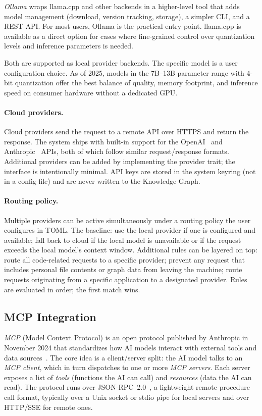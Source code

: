 \emph{Ollama} wraps llama.cpp and other backends in a higher-level tool that
adds model management (download, version tracking, storage), a simpler CLI,
and a REST API. For most users, Ollama is the practical entry point. llama.cpp
is available as a direct option for cases where fine-grained control over
quantization levels and inference parameters is needed.

Both are supported as local provider backends. The specific model is a user
configuration choice. As of 2025, models in the 7B--13B parameter range with
4-bit quantization offer the best balance of quality, memory footprint, and
inference speed on consumer hardware without a dedicated GPU.

\paragraph{Cloud providers.}
Cloud providers send the request to a remote API over HTTPS and return the
response. The system ships with built-in support for the
OpenAI~\cite{openai:api} and Anthropic~\cite{anthropic:api} APIs, both of
which follow similar request/response formats. Additional providers can be
added by implementing the provider trait; the interface is intentionally
minimal. API keys are stored in the system keyring (not in a config file) and
are never written to the Knowledge Graph.

\paragraph{Routing policy.}
Multiple providers can be active simultaneously under a routing policy the
user configures in TOML. The baseline: use the local provider if one is
configured and available; fall back to cloud if the local model is unavailable
or if the request exceeds the local model's context window. Additional rules
can be layered on top: route all code-related requests to a specific provider;
prevent any request that includes personal file contents or graph data from
leaving the machine; route requests originating from a specific application to
a designated provider. Rules are evaluated in order; the first match wins.

\subsection{MCP Integration}
\label{sec:mcp}

\emph{MCP} (Model Context Protocol) is an open protocol published by Anthropic
in November 2024 that standardizes how AI models interact with external tools
and data sources~\cite{mcp:spec}. The core idea is a client/server split: the
AI model talks to an \emph{MCP client}, which in turn dispatches to one or more
\emph{MCP servers}. Each server exposes a list of \emph{tools} (functions the
AI can call) and \emph{resources} (data the AI can read). The protocol runs
over JSON-RPC~2.0~\cite{jsonrpc2}, a lightweight remote procedure call format,
typically over a Unix socket or stdio pipe for local servers and over HTTP/SSE
for remote ones.

